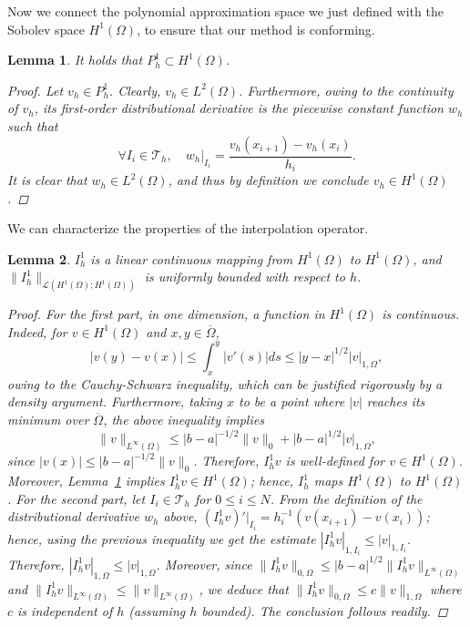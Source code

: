 \documentclass{article}
\newtheorem{lemma}{Lemma}
\begin{document}
Now we connect the polynomial approximation space we just defined with the Sobolev space $H^1(\Omega)$, to ensure that our method is conforming. 
\begin{lemma}\label{approxP1}
    It holds that $P_h^1 \subset H^1(\Omega)$.
    \begin{proof}
    Let $v_h \in P_h^1$. Clearly, $v_h \in L^2(\Omega)$. Furthermore, owing to the continuity of $v_h$, its first-order distributional derivative is the piecewise constant function $w_h$ such that
    $$\forall I_i \in \mathcal{T}_h,\quad  w_h|_{I_i} = \frac{v_h(x_{i+1}) - v_h(x_i)}{h_i}.$$
    It is clear that $w_h\in L^2(\Omega)$, and thus by definition we conclude $v_h\in H^1(\Omega)$.
    \end{proof}
\end{lemma}
We can characterize the properties of the interpolation operator. 
\begin{lemma}\label{cont1D}
    $I_h^1$ is a linear continuous mapping from $H^1(\Omega)$ to $H^1(\Omega)$, and $\|I_h^1\|_{\mathcal{L}(H^1(\Omega);H^1(\Omega))}$ is uniformly bounded with respect to $h$.
    \begin{proof}
    For the first part, in one dimension, a function in $H^1(\Omega)$ is continuous. Indeed, for $v \in H^1(\Omega)$ and $x,y \in \overline{\Omega}$,
    \begin{equation*}\label{eq:interpolator_continuity_1d}
        |v(y) - v(x)| \le \int_x^y |v'(s)| ds  \le |y-x|^{1/2} |v|_{1,\Omega},
    \end{equation*}
    owing to the Cauchy-Schwarz inequality, which can be justified rigorously by a density argument. Furthermore, taking $x$ to be a point where $|v|$ reaches its minimum over $\overline{\Omega}$, the above inequality implies
    \begin{equation*}\label{eq:supnorm_p1}
        \|v\|_{L^\infty(\Omega)} \le |b-a|^{-1/2} \|v\|_0 + |b-a|^{1/2}|v|_{1,\Omega},
    \end{equation*}
    since $|v(x)| \le |b-a|^{-1/2} \|v\|_{0}$. Therefore, $I_h^1 v$ is well-defined for $v \in H^1(\Omega)$. Moreover, Lemma~\ref{approxP1} implies $I_h^1 v \in H^1(\Omega)$; hence, $I_h^1$ maps $H^1(\Omega)$ to $H^1(\Omega)$.
    For the second part, let $I_i \in \mathcal{T}_h$ for $0 \le i \le N$. From the definition of the distributional derivative $w_h$ above, $(I_h^1 v)'|_{I_i} = h_i^{-1}(v(x_{i+1}) - v(x_i))$; hence, using the previous inequality we get the estimate $|I_h^1 v|_{1,I_i} \le |v|_{1,I_i}$. Therefore, $|I_h^1 v|_{1,\Omega} \le |v|_{1,\Omega}$. Moreover, since $\|I_h^1 v\|_{0,\Omega} \le |b-a|^{1/2} \|I_h^1 v\|_{L^\infty(\Omega)}$ and $\|I_h^1 v\|_{L^\infty(\Omega)} \le \|v\|_{L^\infty(\Omega)}$, we deduce that $\|I_h^1 v\|_{0,\Omega} \le c \|v\|_{1,\Omega}$ where $c$ is independent of $h$ (assuming $h$ bounded). The conclusion follows readily.
    \end{proof}
\end{lemma}
\end{document}
